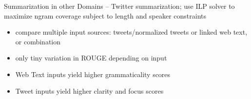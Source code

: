 \documentclass{beamer}
\begin{document}
\begin{frame}{Summarization in other Domains}
\cite{liu2011sxsw} -- Twitter summarization; use ILP solver to maximize
    ngram coverage subject to length and speaker constraints
\begin{itemize}
\item compare multiple input sources: tweets/normalized tweets or linked web
 text, or combination 
\item only tiny variation in ROUGE depending on input
\item Web Text inputs yield higher grammaticality scores
\item Tweet inputs yield higher clarity and focus scores
\end{itemize}
\end{frame}





\end{document}
